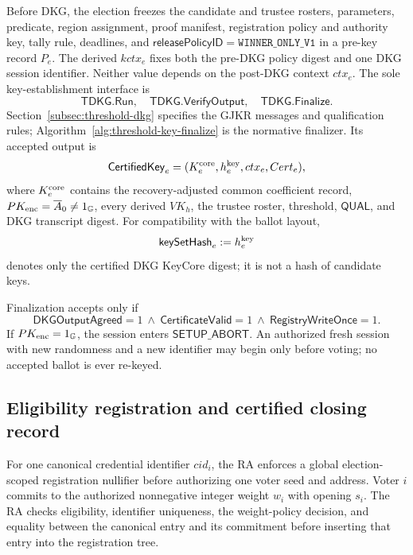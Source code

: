 \documentclass[pdflatex,sn-mathphys-num]{sn-jnl}%
\theoremstyle{thmstyleone}%
\theoremstyle{thmstyletwo}%
\theoremstyle{thmstylethree}%
\begin{document}
Before DKG, the election freezes the candidate and trustee rosters, parameters,
predicate, region assignment, proof manifest, registration policy and
authority key, tally rule, deadlines, and
$\mathsf{releasePolicyID}=\mathtt{WINNER\_ONLY\_V1}$ in a pre-key record
$P_e$.  The derived $kctx_e$ fixes both the pre-DKG policy digest and one DKG
session identifier.  Neither value depends on the post-DKG context $ctx_e$.
The sole key-establishment interface is
\[
 \mathsf{TDKG.Run},\quad\mathsf{TDKG.VerifyOutput},\quad
 \mathsf{TDKG.Finalize}.
\]
Section~\ref{subsec:threshold-dkg} specifies the GJKR messages and
qualification rules; Algorithm~\ref{alg:threshold-key-finalize} is the
normative finalizer.  Its accepted output is
\[
 \mathsf{CertifiedKey}_e=
 (K_e^{\rm core},h_e^{\rm key},ctx_e,Cert_e),
\]
where $K_e^{\rm core}$ contains the recovery-adjusted common coefficient
record, $PK_{\rm enc}=\overline A_0\neq1_{\mathbb G}$, every derived $VK_h$,
the trustee roster, threshold, $\mathsf{QUAL}$, and DKG transcript digest.
For compatibility with the ballot layout,
\[
 \mathsf{keySetHash}_e:=h_e^{\rm key}
\]
denotes only the certified DKG KeyCore digest; it is not a hash of candidate
keys.

Finalization accepts only if
\[
 \mathsf{DKGOutputAgreed}=1\ \land\
 \mathsf{CertificateValid}=1\ \land\
 \mathsf{RegistryWriteOnce}=1.
\]
If $PK_{\rm enc}=1_{\mathbb G}$, the session enters
$\mathsf{SETUP\_ABORT}$.  An authorized fresh session with new randomness and
a new identifier may begin only before voting; no accepted ballot is ever
re-keyed.

\subsection{Eligibility registration and certified closing record}
\label{subsec:registration-commitment}
For one canonical credential identifier $cid_i$, the RA enforces a global
election-scoped registration nullifier before authorizing one voter seed and
address.  Voter $i$ commits to the authorized nonnegative integer weight $w_i$
with opening $s_i$.  The RA checks eligibility, identifier uniqueness, the
weight-policy decision, and equality between the canonical entry and its
commitment before inserting that entry into the registration tree.
\end{document}
